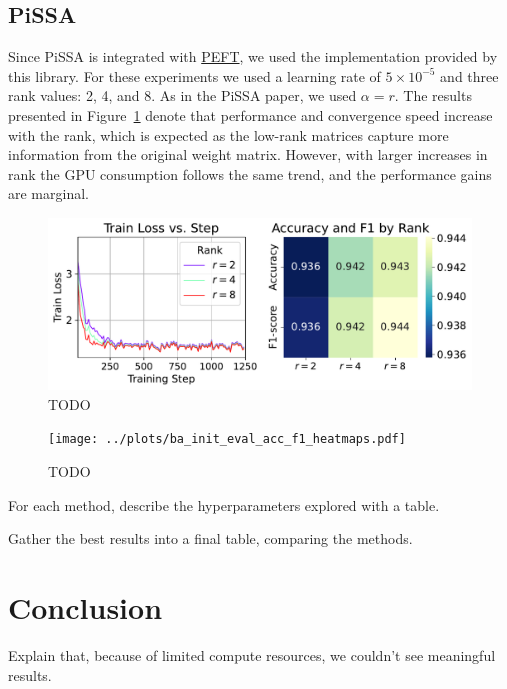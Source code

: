 \documentclass[a4paper,10pt,twocolumn,english]{article}
\begin{document}
\subsection{PiSSA}

Since PiSSA is integrated with \href{https://github.com/huggingface/peft}{PEFT}, we used the implementation provided by this library. For these experiments we used a learning rate of $5 \times 10^{-5}$ and three rank values: 2, 4, and 8. As in the PiSSA paper, we used $\alpha = r$. The results presented in Figure~\ref{fig:pissa} denote that performance and convergence speed increase with the rank, which is expected as the low-rank matrices capture more information from the original weight matrix. However, with larger increases in rank the GPU consumption follows the same trend, and the performance gains are marginal.

\begin{figure}[ht]
    \centering
    \includegraphics[width=1\linewidth]{../plots/pissa_train_loss_vs_step_final_v3.pdf}
    \caption{TODO}
    \label{fig:pissa}
\end{figure}

\begin{figure}[ht]
    \centering
    \texttt{[image: ../plots/ba\_init\_eval\_acc\_f1\_heatmaps.pdf]}
    \caption{TODO}
    \label{fig:ba_init}
\end{figure}

For each method, describe the hyperparameters explored with a table.

Gather the best results into a final table, comparing the methods.

\section{Conclusion}
Explain that, because of limited compute resources, we couldn't see meaningful results.



\end{document}
